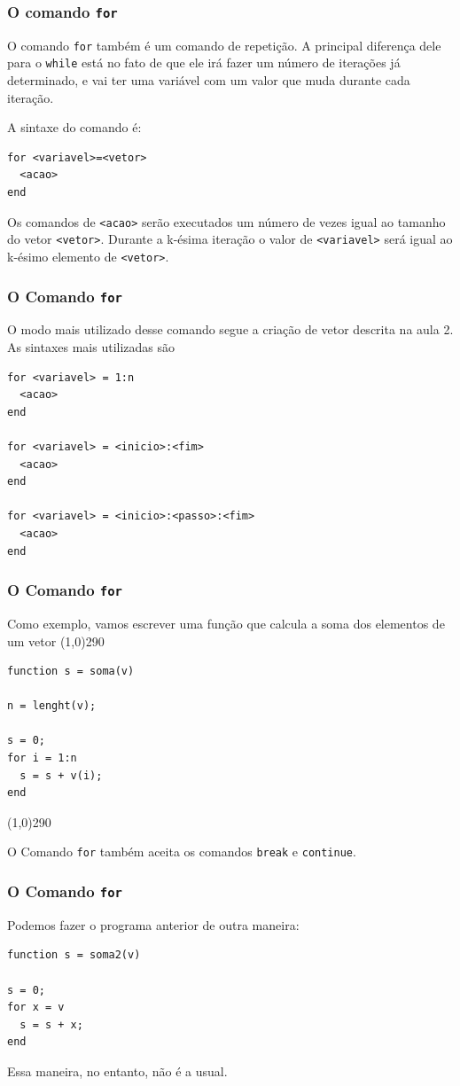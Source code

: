 \documentclass{beamer}
\newcommand{\delim}{\line(1,0){290}}
\begin{document}
\begin{frame}[fragile]
 \frametitle{O comando {\tt for}}

O comando {\tt for} tamb\'em \'e um comando de repeti\c{c}\~ao. A principal diferen\c{c}a dele para o {\tt while} est\'a no fato de que ele ir\'a fazer um n\'umero de itera\c{c}\~oes j\'a determinado, e vai ter uma vari\'avel com um valor que muda durante cada itera\c{c}\~ao.
\pause

A sintaxe do comando \'e:
\begin{verbatim}
for <variavel>=<vetor>
  <acao>
end
\end{verbatim}
\pause

Os comandos de {\tt <acao>} ser\~ao executados um n\'umero de vezes igual ao tamanho do vetor {\tt <vetor>}. Durante a k-\'esima itera\c{c}\~ao o valor de {\tt <variavel>} ser\'a igual ao k-\'esimo elemento de {\tt <vetor>}.

\end{frame}

\begin{frame}[fragile]
 \frametitle{O Comando {\tt for}}

O modo mais utilizado desse comando segue a cria\c{c}\~ao de vetor descrita na aula 2. As sintaxes mais utilizadas s\~ao
{\scriptsize
\begin{verbatim}
for <variavel> = 1:n
  <acao>
end

for <variavel> = <inicio>:<fim>
  <acao>
end

for <variavel> = <inicio>:<passo>:<fim>
  <acao>
end
\end{verbatim}
}

\end{frame}

\begin{frame}[fragile]
\frametitle{O Comando {\tt for}}
Como exemplo, vamos escrever uma fun\c{c}\~ao que calcula a soma dos elementos de um vetor
\pause
\delim
\begin{verbatim}
function s = soma(v)

n = lenght(v);

s = 0;
for i = 1:n
  s = s + v(i);
end
\end{verbatim}

\pause
\delim

O Comando {\tt for} tamb\'em aceita os comandos {\tt break} e {\tt continue}.

\end{frame}

\begin{frame}[fragile]
\frametitle{O Comando {\tt for}}

Podemos fazer o programa anterior de outra maneira:
\pause

\begin{verbatim}
function s = soma2(v)

s = 0;
for x = v
  s = s + x;
end
\end{verbatim}

\pause

Essa maneira, no entanto, n\~ao \'e a usual.

\end{frame}
\end{document}
